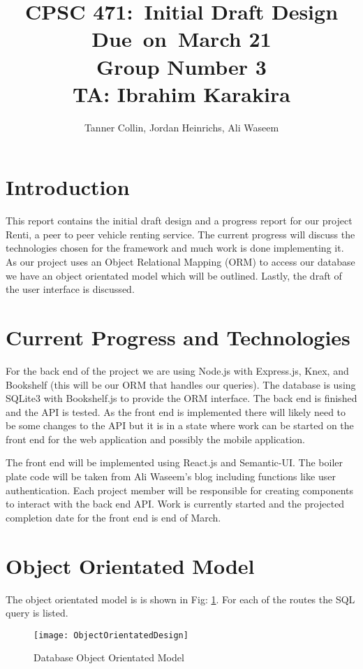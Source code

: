 \documentclass{article}
\title{
\vspace{2in}
\textmd{\textbf{CPSC 471:\ Initial Draft Design}}\\
\normalsize\vspace{0.1in}\small{Due\ on\ March 21 \\ Group Number 3 \\ TA: Ibrahim Karakira}\\
\vspace{3in}
}
\author{Tanner Collin, Jordan Heinrichs, Ali Waseem}
\date{}
\begin{document}
\maketitle
\newpage

\section{Introduction}
This report contains the initial draft design and a progress report for our project Renti, a peer to peer vehicle renting service. The current progress will discuss the
technologies chosen for the framework and much work is done implementing it. As our project uses an Object Relational Mapping (ORM) to access our database we have an
object orientated model which will be outlined. Lastly, the draft of the user interface is discussed. %

\section{Current Progress and Technologies}
For the back end of the project we are using Node.js with Express.js, Knex, and Bookshelf (this will be our ORM that handles our queries). The database is using SQLite3 with Bookshelf.js to provide the ORM interface.
The back end is finished and the API is tested. As the front end is implemented there will likely need to be some changes to the API but it is in a state where work can be started on the front end
for the web application and possibly the mobile application.

The front end will be implemented using React.js and Semantic-UI.
The boiler plate code will be taken from Ali Waseem's blog including functions like user authentication. %
Each project member will be responsible for creating components to interact with the back end API.
Work is currently started and the projected completion date for the front end is end of March.

\section{Object Orientated Model}
The object orientated model is is shown in Fig: \ref{fig:oomodel}. For each of the
routes the SQL query is listed.
\begin{figure}[ht!]
    \texttt{[image: ObjectOrientatedDesign]}
    \caption{Database Object Orientated Model}
    \centering
    \label{fig:oomodel}
\end{figure}
\end{document}
